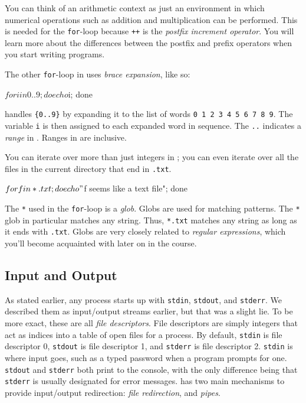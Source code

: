 
You can think of an arithmetic context as just an environment in which numerical
operations such as addition and multiplication can be performed. This is needed
for the \texttt{for}-loop because \texttt{++} is the \emph{postfix increment
operator}. You will learn more about the differences between the postfix and
prefix operators when you start writing \C{} programs.

The other \texttt{for}-loop in \Bash{} uses \emph{brace expansion}, like so:

\begin{shlisting}{}
$ for i in {0..9}; do echo $i; done
\end{shlisting}

\Bash{} handles \texttt{\{0..9\}} by expanding it to the list of words \texttt{0
1 2 3 4 5 6 7 8 9}. The variable \texttt{i} is then assigned to each expanded
word in sequence. The \texttt{..} indicates a \emph{range} in \Bash{}. Ranges in
\Bash{} are inclusive.

You can iterate over more than just integers in \Bash{}; you can even iterate
over all the files in the current directory that end in \texttt{.txt}.

\begin{shlisting}{}
$ for f in *.txt; do echo "$f seems like a text file"; done
\end{shlisting}

The \texttt{*} used in the \texttt{for}-loop is a \emph{glob}. Globs are used
for matching patterns. The \texttt{*} glob in particular matches any string.
Thus, \texttt{*.txt} matches any string as long as it ends with \texttt{.txt}.
Globs are very closely related to \emph{regular expressions}, which you'll
become acquainted with later on in the course.

\subsection{Input and Output}

As stated earlier, any \Unix{} process starts up with \texttt{stdin},
\texttt{stdout}, and \texttt{stderr}. We described them as input/output streams
earlier, but that was a slight lie. To be more exact, these are all \emph{file
descriptors}. File descriptors are simply integers that act as indices into a
table of open files for a process. By default, \texttt{stdin} is file descriptor
0, \texttt{stdout} is file descriptor 1, and \texttt{stderr} is file descriptor
2. \texttt{stdin} is where input goes, such as a typed password when a program
prompts for one. \texttt{stdout} and \texttt{stderr} both print to the console,
with the only difference being that \texttt{stderr} is usually designated for
error messages. \Bash{} has two main mechanisms to provide input/output
redirection: \emph{file redirection}, and \emph{pipes}.

